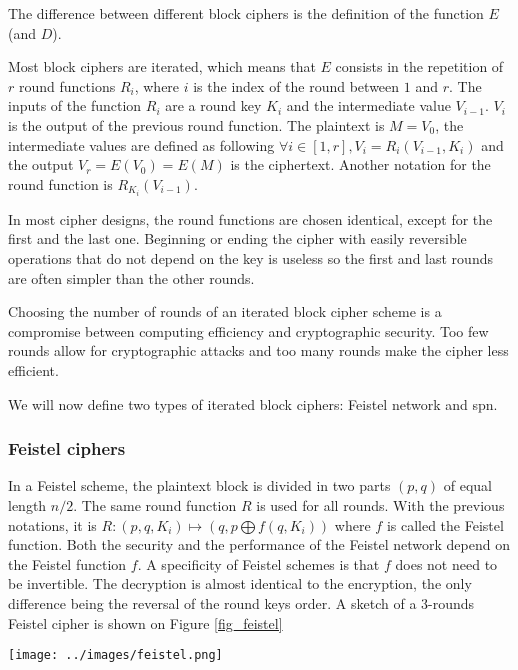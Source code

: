 \documentclass[11pt]{sdm}
\begin{document}
The difference between different block ciphers is the definition of the function $E$ (and $D$).

Most block ciphers are iterated, which means that $E$ consists in the repetition of $r$ round functions $R_i$, where $i$ is the index of the round between $1$ and $r$.
The inputs of the function $R_i$ are a round key $K_i$ and the intermediate value $V_{i-1}$.
$V_i$ is the output of the previous round function.
The plaintext is $M=V_0$, the intermediate values are defined as following $ \forall i \in [ 1,r ] , V_i = R_i(V_{i-1},K_i) $ and the output $V_r = E(V_0) = E(M)$ is the ciphertext.
Another notation for the round function is $R_{K_i}(V_{i-1})$.

In most cipher designs, the round functions are chosen identical, except for the first and the last one.
Beginning or ending the cipher with easily reversible operations that do not depend on the key is useless so the first and last rounds are often simpler than the other rounds.

Choosing the number of rounds of an iterated block cipher scheme is a compromise between computing efficiency and cryptographic security.
Too few rounds allow for cryptographic attacks and too many rounds make the cipher less efficient.

We will now define two types of iterated block ciphers: Feistel network and \acrlong{spn}.

\subsubsection{Feistel ciphers}

In a Feistel scheme, the plaintext block is divided in two parts $(p,q)$ of equal length $n/2$.
The same round function $R$ is used for all rounds.
With the previous notations, it is $R: (p,q, K_i) \mapsto (q,p \bigoplus f(q,K_i))$ where $f$ is called the Feistel function.
Both the security and the performance of the Feistel network depend on the Feistel function $f$.
A specificity of Feistel schemes is that $f$ does not need to be invertible.
The decryption is almost identical to the encryption, the only difference being the reversal of the round keys order.
A sketch of a 3-rounds Feistel cipher is shown on Figure \ref{fig_feistel}

\begin{center}
    \texttt{[image: ../images/feistel.png]}
    \captionsetup{hypcap=false}
    \label{fig_feistel}
\end{center}
\end{document}
